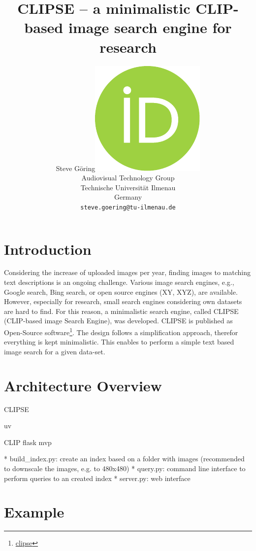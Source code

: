 \documentclass{article}
\title{CLIPSE -- a minimalistic CLIP-based image search engine for research}
\author{ Steve Göring\hspace{1mm}\href{https://orcid.org/0000-0001-6810-6969}{\includegraphics[scale=0.06]{orcid.pdf}}\\
    Audiovisual Technology Group\\
    Technische Universität Ilmenau\\
    Germany \\
    \texttt{steve.goering@tu-ilmenau.de} \\
}
\begin{document}
\maketitle

\begin{abstract}

\end{abstract}




\section{Introduction}
Considering the increase of uploaded images per year, finding images to matching text descriptions is an ongoing challenge.
Various image search engines, e.g., Google search, Bing search, or open source engines (XY, XYZ), are available.
However, especially for research, small search engines considering own datasets are hard to find.
For this reason, a minimalistic search engine, called CLIPSE (CLIP-based image Search Engine), was developed.
CLIPSE is published as Open-Source software\footnote{\url{clipse}}.
The design follows a simplification approach, therefor everything is kept minimalistic.
This enables to perform a simple text based image search for a given data-set.



\section{Architecture Overview}
CLIPSE

uv

CLIP
flask
mvp


* build\_index.py: create an index based on a folder with images (recommended to downscale the images, e.g. to 480x480)
* query.py: command line interface to perform queries to an created index
* server.py: web interface

\section{Example}




\end{document}
